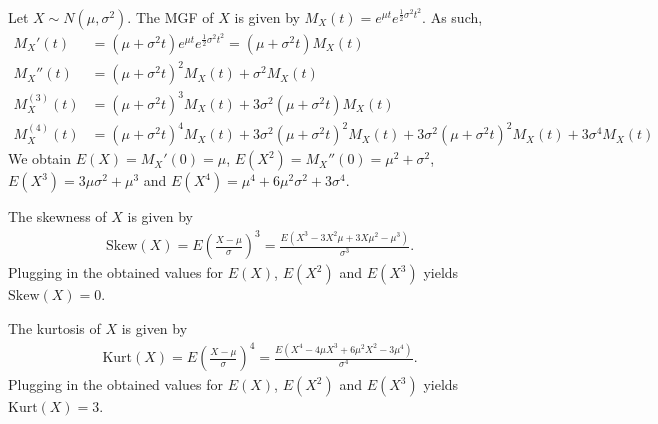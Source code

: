 \begin{Solution}{1.20}
			Let $X \sim N(\mu, \sigma^2)$. The MGF of $X$ is given by $M_X(t) = e^{\mu t} e^{\frac{1}{2} \sigma^2 t^2}$. As such,
			\begin{align*}
				M_X'(t) & = (\mu + \sigma^2 t) e^{\mu t} e^{\frac{1}{2} \sigma^2 t^2} = (\mu + \sigma^2 t) M_X(t) \\
				M_X''(t) & = (\mu + \sigma^2 t)^2 M_X(t) + \sigma^2 M_X(t) \\
				M_X^{(3)}(t) & = (\mu + \sigma^2 t)^3 M_X(t) + 3 \sigma^2 (\mu + \sigma^2 t) M_X(t) \\
				M_X^{(4)}(t) & = (\mu + \sigma^2 t)^4 M_X(t) + 3 \sigma^2 (\mu + \sigma^2 t)^2 M_X(t) + 3 \sigma^2 (\mu + \sigma^2 t)^2 M_X(t) + 3 \sigma^4 M_X(t)
			\end{align*}	
			We obtain $E(X) = M_X'(0) = \mu$, $E(X^2) = M_X''(0) = \mu^2 + \sigma^2$, $E(X^3) = 3 \mu \sigma^2 + \mu^3$ and $E(X^4) = \mu^4 + 6 \mu^2 \sigma^2 + 3 \sigma^4$.
			
			The skewness of $X$ is given by
			\begin{align*}
				\text{Skew}(X) = E\left(\frac{X - \mu}{\sigma}\right)^3 = \frac{E\left(X^3 - 3X^2 \mu + 3X \mu^2 - \mu^3\right)}{\sigma^3}.
			\end{align*}	
			Plugging in the obtained values for $E(X)$, $E(X^2)$ and $E(X^3)$ yields $\text{Skew}(X) = 0$.
			
			The kurtosis of $X$ is given by
			\begin{align*}
				\text{Kurt}(X) = E\left(\frac{X - \mu}{\sigma}\right)^4 = \frac{E\left(X^4 - 4 \mu X^3 + 6 \mu^2 X^2 - 3 \mu^4\right)}{\sigma^4}.
			\end{align*}	
			Plugging in the obtained values for $E(X)$, $E(X^2)$ and $E(X^3)$ yields $\text{Kurt}(X) = 3$.
		
\end{Solution}
